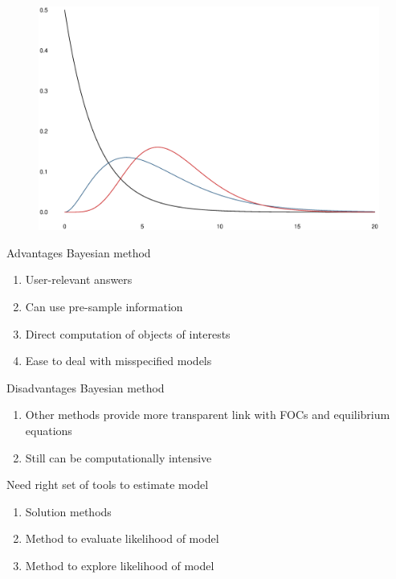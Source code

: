 \documentclass{beamer}
\begin{document}
\begin{frame}
\begin{figure}
    \includegraphics[scale=.3]{prior_gamma.eps}
  \end{figure}
\end{frame}

\begin{frame}
  Advantages Bayesian method
  \begin{enumerate}
    \item User-relevant answers
    \item Can use pre-sample information
    \item Direct computation of objects of interests
    \item Ease to deal with misspecified models
  \end{enumerate}
  \medskip
  Disadvantages Bayesian method
  \begin{enumerate}
    \item Other methods provide more transparent link with FOCs and equilibrium equations
    \item Still can be computationally intensive
  \end{enumerate}
\end{frame}

\begin{frame}
 Need right set of tools to estimate model
 \begin{enumerate}
   \item Solution methods
   \item Method to evaluate likelihood of model
   \item Method to explore likelihood of model
 \end{enumerate}
\end{frame}
\end{document}
